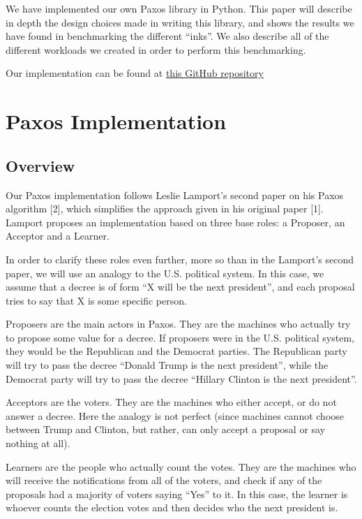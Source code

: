 \documentclass[12pt,]{article}
\begin{document}
We have implemented our own Paxos library in Python. This paper will
describe in depth the design choices made in writing this library, and
shows the results we have found in benchmarking the different ``inks''.
We also describe all of the different workloads we created in order to
perform this benchmarking.

Our implementation can be found at \href{https://github.com/victordomene/ram-paxos}{this GitHub repository}

\section{Paxos Implementation}\label{paxos-implementation}

\subsection{Overview}\label{overview}

Our Paxos implementation follows Leslie Lamport's second paper on his
Paxos algorithm {[}2{]}, which simplifies the approach given in his
original paper {[}1{]}. Lamport proposes an implementation based on
three base roles: a Proposer, an Acceptor and a Learner.

In order to clarify these roles even further, more so than in the
Lamport's second paper, we will use an analogy to the U.S. political
system. In this case, we assume that a decree is of form ``X will be the
next president'', and each proposal tries to say that X is some specific
person.

Proposers are the main actors in Paxos. They are the machines who
actually try to propose some value for a decree. If proposers were in
the U.S. political system, they would be the Republican and the Democrat
parties. The Republican party will try to pass the decree ``Donald Trump
is the next president'', while the Democrat party will try to pass the
decree ``Hillary Clinton is the next president''.

Acceptors are the voters. They are the machines who either accept, or do
not answer a decree. Here the analogy is not perfect (since machines
cannot choose between Trump and Clinton, but rather, can only accept a
proposal or say nothing at all).

Learners are the people who actually count the votes. They are the
machines who will receive the notifications from all of the voters, and
check if any of the proposals had a majority of voters saying ``Yes'' to
it. In this case, the learner is whoever counts the election votes and
then decides who the next president is.
\end{document}

